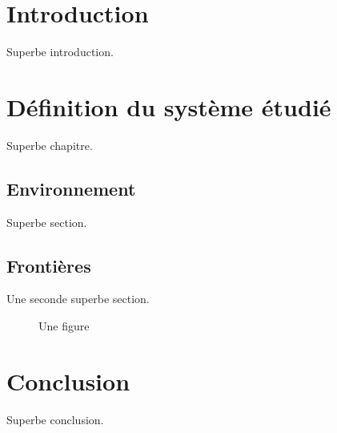 \documentclass[12pt, openany]{report}
\begin{document}
\def\chaptername{Partie} %


\frontmatter
\tableofcontents
\mainmatter

\chapter*{Introduction}

Superbe introduction.
\lipsum


\newpage

\chapter{Définition du système étudié}

Superbe chapitre.
\lipsum[1]

\section{Environnement}

Superbe section.
\lipsum[1]

\section{Frontières}

Une seconde superbe section.

\begin{figure}[!h]
  \centering
  \caption{Une figure}
  \label{fig:figure}
\end{figure}

\chapter{Conclusion}

Superbe conclusion.
\lipsum


\newpage
\listoffigures
\end{document}
